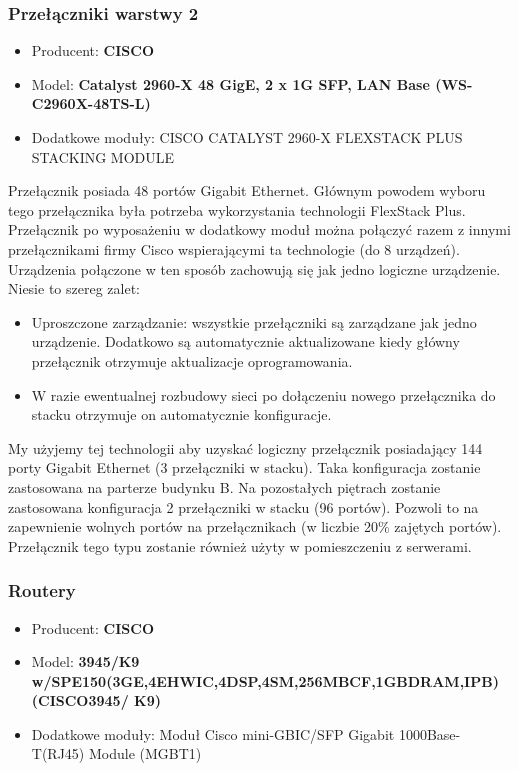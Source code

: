 \documentclass[12pt,a4paper,titlepage]{article}
\begin{document}
\subsubsection{Przełączniki warstwy 2}
\begin{itemize}
    \item Producent: \textbf{CISCO}
    \item Model: \textbf{Catalyst 2960-X 48 GigE, 2 x 1G SFP, LAN Base (WS-C2960X-48TS-L)}
    \item Dodatkowe moduły: CISCO CATALYST 2960-X FLEXSTACK PLUS STACKING MODULE
\end{itemize}

Przełącznik posiada 48 portów Gigabit Ethernet. Głównym powodem wyboru tego przełącznika była potrzeba wykorzystania technologii FlexStack Plus. Przełącznik po wyposażeniu w dodatkowy moduł można połączyć razem z innymi przełącznikami firmy Cisco wspierającymi ta technologie (do 8
urządzeń). Urządzenia połączone w ten sposób zachowują się jak jedno logiczne urządzenie. Niesie to szereg zalet:

\begin{itemize}
    \item Uproszczone zarządzanie: wszystkie przełączniki są zarządzane jak jedno urządzenie. Dodatkowo są automatycznie aktualizowane kiedy główny przełącznik otrzymuje aktualizacje oprogramowania.
    \item W razie ewentualnej rozbudowy sieci po dołączeniu nowego przełącznika do stacku otrzymuje on automatycznie konfiguracje.
\end{itemize}

My użyjemy tej technologii aby uzyskać logiczny przełącznik posiadający 144 porty Gigabit Ethernet (3 przełączniki w stacku). Taka konfiguracja zostanie zastosowana na parterze budynku B. Na pozostałych piętrach zostanie zastosowana konfiguracja 2 przełączniki w stacku (96 portów). Pozwoli to na zapewnienie wolnych portów na przełącznikach (w liczbie 20\% zajętych portów). Przełącznik tego typu zostanie również użyty w pomieszczeniu z serwerami.

\subsubsection{Routery}
\begin{itemize}
    \item Producent: \textbf{CISCO}
    \item Model: \textbf{3945/K9 w/SPE150(3GE,4EHWIC,4DSP,4SM,256MBCF,1GBDRAM,IPB) (CISCO3945/
K9)}
    \item Dodatkowe moduły: Moduł Cisco mini-GBIC/SFP Gigabit 1000Base-T(RJ45) Module (MGBT1)
\end{itemize}
\end{document}
